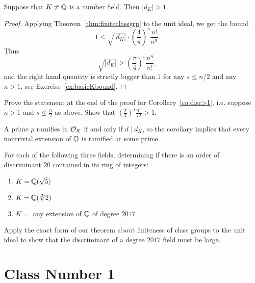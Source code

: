 \begin{corollary}\label{co:disc>1}
	Suppose that $K\neq \mathbb{Q}$ is a number field.  Then $|d_K|>1$.
\end{corollary}
\begin{proof}
	Applying Theorem~\ref{thm:finiteclassgrp} to the unit ideal,
	we get the bound
	$$
		 1\leq \sqrt{|d_K|}\cdot \left(\frac{4}{\pi}\right)^s\frac{n!}{n^n}.
	$$
	Thus
	$$
		\sqrt{|d_K|}
		\geq
		\left(\frac{\pi}{4}\right)^s\frac{n^n}{n!},
	$$
	and the right hand quantity is strictly bigger than $1$ for
	any $s\leq n/2$ and any $n>1$, see Exercise~\ref{ex:basicKbound}.
\end{proof}

\begin{exercise}\label{ex:basicKbound}
	Prove the statement at the end of the proof for Corollary~\ref{co:disc>1},
	i.e. suppose $n>1$ and $s\leq \frac{n}{2}$ as above. Show that
	$\left(\frac{\pi}{4}\right)^s\frac{n^n}{n!} > 1.$
\end{exercise}

A prime $p$ ramifies in $\mathcal{O}_K$ if and only if $d\mid d_K$,
so the corollary implies that every nontrivial extension of $\mathbb{Q}$
is ramified at some prime.

\begin{exercise}
	For each of the following three fields, determining if there is
	an order of discriminant $20$ contained in its ring of integers:
	\begin{enumerate}
		\item $K = \mathbb{Q}(\sqrt{5})$
		\item $K = \mathbb{Q}(\sqrt[3]{2})$
		\item $K = $ any extension of $\mathbb{Q}$ of degree $2017$
	\end{enumerate}

	\begin{hint}
		Apply the exact form of our theorem about finiteness of class groups
		to the unit ideal to show that the discriminant of a degree $2017$
		field must be large.
	\end{hint}
\end{exercise}

\section{Class Number 1}\label{sec:cn1}

